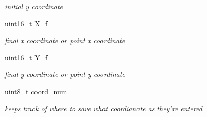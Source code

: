 \begin{DoxyCompactItemize}
\begin{DoxyCompactList}\small\item\em initial y coordinate \end{DoxyCompactList}\item 
\hypertarget{classtask__read_a45ee53e6563d1c78e648a2cb83128e84}{uint16\-\_\-t \hyperlink{classtask__read_a45ee53e6563d1c78e648a2cb83128e84}{X\-\_\-f}}\label{classtask__read_a45ee53e6563d1c78e648a2cb83128e84}

\begin{DoxyCompactList}\small\item\em final x coordinate or point x coordinate \end{DoxyCompactList}\item 
\hypertarget{classtask__read_afa1659ce594c1d8ffec4faed638919fb}{uint16\-\_\-t \hyperlink{classtask__read_afa1659ce594c1d8ffec4faed638919fb}{Y\-\_\-f}}\label{classtask__read_afa1659ce594c1d8ffec4faed638919fb}

\begin{DoxyCompactList}\small\item\em final y coordinate or point y coordinate \end{DoxyCompactList}\item 
\hypertarget{classtask__read_ae0192fd60c1c29fde6aad37ea5fc8bcd}{uint8\-\_\-t \hyperlink{classtask__read_ae0192fd60c1c29fde6aad37ea5fc8bcd}{coord\-\_\-num}}\label{classtask__read_ae0192fd60c1c29fde6aad37ea5fc8bcd}

\begin{DoxyCompactList}\small\item\em keeps track of where to save what coordianate as they're entered \end{DoxyCompactList}\end{DoxyCompactItemize}


